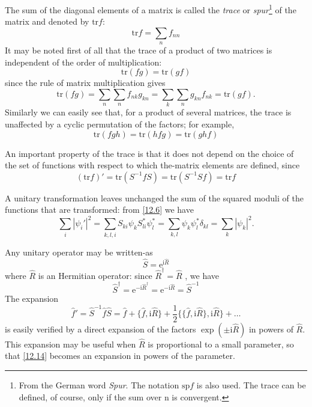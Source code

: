 The sum of the diagonal elements of a matrix is called the \textit{trace} or \textit{spur}\footnote{From the German word \textit{Spur}. The notation $ \mathrm{sp}f $ is also used. The trace can be defined, of course, only if the sum over n is convergent.
} of the matrix and denoted by $ \mathrm{tr}f: $
\begin{equation}\label{12.8}
\mathrm{tr}f=\sum_nf_{nn}
\end{equation}
It may be noted first of all that the trace of a product of two matrices is independent of the order of multiplication:
\begin{equation}\label{12.9}
\mathrm{tr}(fg)=\mathrm{tr}(gf)
\end{equation}
since the rule of matrix multiplication gives
\[ \mathrm{tr}(fg)=\sum_n\sum_nf_{nk}g_{kn}=\sum_k\sum_ng_{kn}f_{nk}=\mathrm{tr}(gf). \]
Similarly we can easily see that, for a product of several matrices, the trace is unaffected by a cyclic permutation of the factors; for example,
\begin{equation}\label{12.10}
\mathrm{tr}(fgh)=\mathrm{tr}(hfg)=\mathrm{tr}(ghf)
\end{equation}


An important property of the trace is that it does not depend on the choice of the set of functions with respect to which the-matrix elements are defined, since
\begin{equation}\label{12.11}
(\mathrm{tr}f)'=\mathrm{tr}(S^{-1}fS)=\mathrm{tr}(S^{-1}Sf)=\mathrm{tr}f
\end{equation}


A unitary transformation leaves unchanged the sum of the squared moduli of the functions that are transformed: from \eqref{12.6} we have
\begin{equation}\label{12.12}
\sum_{i}|\psi_i'|^2=\sum_{k,l,i}S_{ki}\psi_kS_{li}^*\psi_l^*=\sum_{k,l}\psi_k\psi_l^*\delta_{kl}=\sum_{k}|\psi_k|^2.
\end{equation}


Any unitary operator may be written-as
\begin{equation}\label{12.13}
\hat{S}=\mathrm{e}^{\mathrm{i}\hat{R}}
\end{equation}
where $ \hat{R} $ is an Hermitian operator: since $  \hat{R}^\dag=\hat{R}$ , we have
\[ \hat{S}^\dag=\mathrm{e}^{-\mathrm{i}\hat{R}^\dag}=\mathrm{e}^{-\mathrm{i}\hat{R}}=\hat{S}^{-1} \]
The expansion
\begin{equation}\label{12.14}
\hat{f}'=\hat{S}^{-1}\hat{f}\hat{S}=\hat{f}+\{\hat{f},\mathrm{i}\hat{R} \}+\frac{1}{2}\{\{\hat{f},\mathrm{i}\hat{R}\}, \mathrm{i}\hat{R}\}+\dots
\end{equation}
is easily verified by a direct expansion of the factors $ \exp(\pm\mathrm{i}\hat{R}) $ in powers of $ \hat{R} $. This expansion may be useful when $ \hat{R} $ is proportional to a small parameter, so that \eqref{12.14} becomes an expansion in powers of the parameter.
